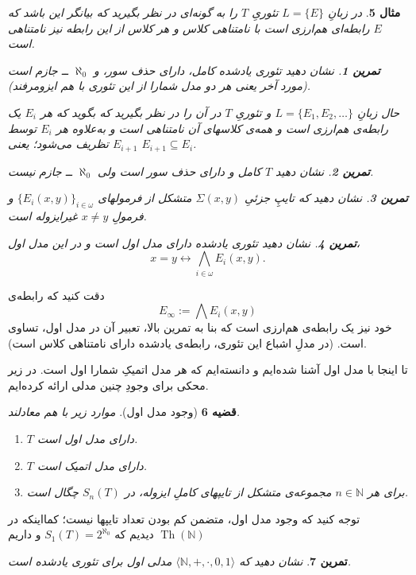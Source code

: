 \documentclass[12pt,a4paper]{article}
\theoremstyle{colorhead}
\newtheorem{thm}{قضیه}
\newtheorem{tam}[thm]{تمرین}
\newtheorem{mesal}[thm]{مثال}
\DeclareMathOperator{\Th}{Th}
\begin{document}
\begin{mesal}
در زبانِ
$L=\{E\}$
تئوریِ
$T$
را به گونه‌ای در نظر بگیرید که بیانگر این  باشد که
$E$
رابطه‌ای هم‌ارزی است با نامتناهی کلاس و هر کلاس از این رابطه نیز نامتناهی است.
\begin{tam}
نشان دهید تئوری یادشده کامل، دارای حذف سور، و 
$\aleph_0$
ــ‌ جازم است (مورد آخر یعنی هر دو مدل شمارا از این تئوری با هم ایزومرفند).
\end{tam}
حال زبانِ
$L=\{E_1,E_2,\ldots\}$
و تئوریِ
$T$
در آن را در نظر بگیرید که بگوید که
هر
$E_i$
یک رابطه‌ی هم‌ارزی است و همه‌ی کلاسهای آن نامتناهی است و به‌علاوه 
هر
$E_i$
توسط
$E_{i+1}$
تظریف می‌شود؛ یعنی
$E_{i+1}\subseteq E_i$.
\begin{tam}
نشان دهید
$T$
کامل و دارای حذف سور است ولی
$\aleph_0$  ــ‌
جازم نیست.
\end{tam}
\begin{tam}
نشان دهید که
تایپِ جزئیِ
$\Sigma(x,y)$
متشکل از فرمولهای
$\{E_i(x,y)\}_{i\in \omega}$
و فرمولِ
$x\not=y$
غیرایزوله است.
\end{tam}
\begin{tam}
نشان دهید تئوری یادشده دارای مدل اول است و در این مدل اول،
\[
x=y\leftrightarrow \bigwedge_{i\in \omega} E_i(x,y).\]
\end{tam}
\end{mesal}
دقت کنید که رابطه‌ی
\[
E_\infty:=\bigwedge E_i(x,y)
\]
خود نیز یک رابطه‌ی هم‌ارزی است که بنا به تمرین بالا، تعبیر آن در مدل اول، تساوی است. (در مدلِ اشباع این تئوری، رابطه‌ی
یادشده دارای نامتناهی کلاس است).
\par 
تا اینجا با مدل اول آشنا شده‌ایم و دانسته‌ایم که هر مدل اتمیکِ شمارا اول است. در زیر محکی برای
وجودِ چنین مدلی ارائه کرده‌ایم.
\begin{thm}[وجود مدل اول]
موارد زیر با هم معادلند.
\begin{enumerate}
\item 
$T$
دارای مدل اول است.
\item 
$T$
دارای مدل اتمیک است.
\item 
برای هر
$n\in \mathbb{N}$
مجموعه‌ی متشکل از تایپهای کاملِ
ایزوله، در
$S_n(T)$
چگال است. 
\end{enumerate}
\end{thm}
توجه کنید که وجود مدل اول، متضمن کم بودن تعداد تایپها نیست؛ کمااینکه در
$\Th(\mathbb{N})$
دیدیم که 
$S_1(T)=2^{\aleph_0}$
و داریم
\begin{tam}
نشان دهید که 
$\langle \mathbb{N},+,\cdot,0,1\rangle$
مدلی اول برای تئوری یادشده است. 
\end{tam}
\pagebreak
\end{document}
